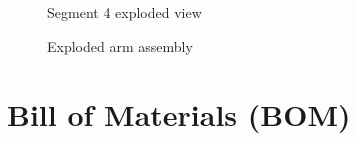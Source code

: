 \documentclass[a4paper,11pt]{article}
\begin{document}
\begin{figure}[h!]
    \centering
    \begin{minipage}{0.48\linewidth}
        \centering
         
        \caption{Segment 4 assembly}
        \label{fig:seg4}
    \end{minipage}
    \hfill
    \begin{minipage}{0.48\linewidth}
        \centering
         
        \caption{Segment 4 exploded view}
        \label{fig:seg4_exp}
    \end{minipage}
\end{figure}

\begin{figure}[h!]
    \centering
     
    \caption{Exploded arm assembly}
    \label{fig:seg5}
\end{figure}

\section{Bill of Materials (BOM)}
\end{document}
